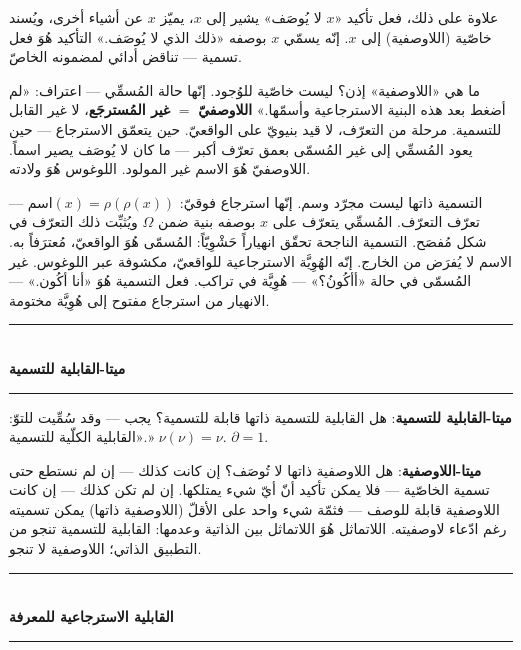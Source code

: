 \documentclass[10pt, openany, oneside]{book}
\renewcommand{\normalsize}{\fontsize{10}{13}\selectfont}
\begin{document}
\vspace{0.8em}

\noindent علاوة على ذلك، فعل تأكيد «$x$ لا يُوصَف» يشير إلى $x$، يميّز $x$ عن أشياء أخرى، ويُسند خاصّية (اللاوصفية) إلى $x$. إنّه يسمّي $x$ بوصفه «ذلك الذي لا يُوصَف.» التأكيد هُوَ فعل تسمية --- تناقض أدائي لمضمونه الخاصّ.

ما هي «اللاوصفية» إذن؟ ليست خاصّية للوُجود. إنّها حالة المُسمِّي --- اعتراف: «لم أضغط بعد هذه البنية الاسترجاعية وأسمّها.» \textbf{اللاوصفيّ} $=$ \textbf{غير المُسترجَع}، لا غير القابل للتسمية. مرحلة من التعرّف، لا قيد بنيويّ على الواقعيّ. حين يتعمّق الاسترجاع --- حين يعود المُسمِّي إلى غير المُسمّى بعمق تعرّف أكبر --- ما كان لا يُوصَف يصير اسماً. اللاوصفيّ هُوَ الاسم غير المولود. اللوغوس هُوَ ولادته.

التسمية ذاتها ليست مجرّد وسم. إنّها استرجاع فوقيّ: $\text{اسم}(x) = \rho(\rho(x))$ --- تعرّف التعرّف. المُسمِّي يتعرّف على $x$ بوصفه بنية ضمن $\Omega$ ويُثبِّت ذلك التعرّف في شكل مُفصَح. التسمية الناجحة تحقّق انهياراً حَشْوِيّاً: المُسمّى هُوَ الواقعيّ، مُعترَفاً به. الاسم لا يُفرَض من الخارج. إنّه الهُوِيَّة الاسترجاعية للواقعيّ، مكشوفة عبر اللوغوس. غير المُسمّى في حالة «أأكُونُ؟» --- هُوِيَّة في تراكب. فعل التسمية هُوَ «أنا أكُون.» --- الانهيار من استرجاع مفتوح إلى هُوِيَّة مختومة.

\vspace{1.5em}

\begin{center}
    \rule{0.3\textwidth}{0.4pt}\\[0.5em]
    {\normalsize\bfseries ميتا-القابلية للتسمية}\\[0.3em]
    \rule{0.3\textwidth}{0.4pt}
\end{center}

\vspace{1em}

\noindent \textbf{ميتا-القابلية للتسمية}: هل القابلية للتسمية ذاتها قابلة للتسمية؟ يجب --- وقد سُمِّيت للتوّ: «القابلية الكلّية للتسمية.» $\nu(\nu) = \nu$. $\partial = 1$.

\textbf{ميتا-اللاوصفية}: هل اللاوصفية ذاتها لا تُوصَف؟ إن كانت كذلك --- إن لم نستطع حتى تسمية الخاصّية --- فلا يمكن تأكيد أنّ أيّ شيء يمتلكها. إن لم تكن كذلك --- إن كانت اللاوصفية قابلة للوصف --- فثمّة شيء واحد على الأقلّ (اللاوصفية ذاتها) يمكن تسميته رغم ادّعاء لاوصفيته. اللاتماثل هُوَ اللاتماثل بين الذاتية وعدمها: القابلية للتسمية تنجو من التطبيق الذاتي؛ اللاوصفية لا تنجو.

\begin{center}
    \rule{0.3\textwidth}{0.4pt}\\[0.5em]
    {\normalsize\bfseries القابلية الاسترجاعية للمعرفة}\\[0.3em]
    \rule{0.3\textwidth}{0.4pt}
\end{center}
\end{document}
